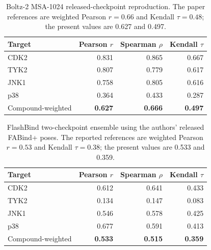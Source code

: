 \documentclass[11pt]{article}
\begin{document}
\begin{table}[H]
\centering
\small
\begin{tabular}{lrrr}
\toprule
Target & Pearson $r$ & Spearman $\rho$ & Kendall $\tau$ \\
\midrule
CDK2 & 0.831 & 0.865 & 0.667 \\
TYK2 & 0.807 & 0.779 & 0.617 \\
JNK1 & 0.758 & 0.805 & 0.616 \\
p38  & 0.364 & 0.433 & 0.287 \\
\midrule
\rowcolor{boltzbg}
Compound-weighted & \textbf{0.627} & \textbf{0.666} & \textbf{0.497} \\
\bottomrule
\end{tabular}
\caption{Boltz-2 MSA-1024 released-checkpoint reproduction. The paper
references are weighted Pearson $r=0.66$ and Kendall $\tau=0.48$; the present
values are 0.627 and 0.497.}
\end{table}

\begin{table}[H]
\centering
\small
\begin{tabular}{lrrr}
\toprule
Target & Pearson $r$ & Spearman $\rho$ & Kendall $\tau$ \\
\midrule
CDK2 & 0.612 & 0.641 & 0.433 \\
TYK2 & 0.134 & 0.147 & 0.083 \\
JNK1 & 0.546 & 0.578 & 0.425 \\
p38  & 0.677 & 0.591 & 0.413 \\
\midrule
\rowcolor{highlightbg}
Compound-weighted & \textbf{0.533} & \textbf{0.515} & \textbf{0.359} \\
\bottomrule
\end{tabular}
\caption{FlashBind two-checkpoint ensemble using the authors' released
FABind+ poses. The reported references are weighted Pearson $r=0.53$ and
Kendall $\tau=0.38$; the present values are 0.533 and 0.359.}
\end{table}
\end{document}
